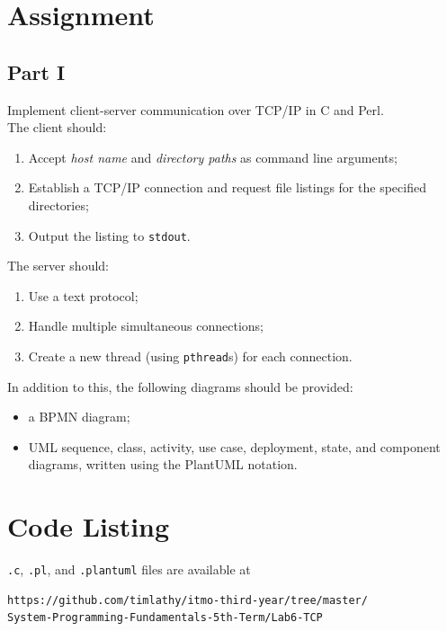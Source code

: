 \documentclass[en, listings]{labreport}
\begin{document}
\maketitlepage

\section*{Assignment}

\subsection*{Part I}

Implement client-server communication over TCP/IP in C and Perl.\\

The client should:
\begin{enumerate}
\item Accept \textit{host name} and \textit{directory paths} as command line arguments;
\item Establish a TCP/IP connection and request file listings for the specified directories;
\item Output the listing to \texttt{stdout}.
\end{enumerate}

The server should:
\begin{enumerate}
\item Use a text protocol;
\item Handle multiple simultaneous connections;
\item Create a new thread (using \texttt{pthread}s) for each connection.
\end{enumerate}

In addition to this, the following diagrams should be provided:
\begin{itemize}
\item a BPMN diagram;
\item UML sequence, class, activity, use case, deployment, state, and component diagrams,
  written using the PlantUML notation.
\end{itemize}

\section*{Code Listing}

\verb|.c|, \verb|.pl|, and \verb|.plantuml| files are available at
\begin{verbatim}
https://github.com/timlathy/itmo-third-year/tree/master/
System-Programming-Fundamentals-5th-Term/Lab6-TCP
\end{verbatim}
\end{document}
